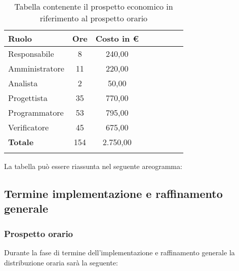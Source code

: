 			\begin{longtable}{|l|c|c|c|c|c|c|c|}
				\hline
				\rowcolor{lighter-grayer}
				\textbf{Ruolo} & \textbf{Ore} & \textbf{Costo in €} \\
				\hline
				\endfirsthead
				
				\hline
				Responsabile & 8 & 240,00\\
				\hline
				\hline
				Amministratore & 11 & 220,00\\
				\hline
				\hline
				Analista & 2 & 50,00\\
				\hline
				\hline
				Progettista & 35 & 770,00\\
				\hline
				\hline
				Programmatore & 53 & 795,00\\
				\hline
				\hline
				Verificatore & 45 & 675,00\\
				\hline
				\textbf{Totale} & 154 & 2.750,00\\
				\hline
				\caption{Tabella contenente il prospetto economico in riferimento al prospetto orario}
			\end{longtable}
			\pagebreak
		
			La tabella può essere riassunta nel seguente areogramma:

			\subsection{Termine implementazione e raffinamento generale}
            \subsubsection{Prospetto orario}
			Durante la fase di termine dell'implementazione e raffinamento generale la distribuzione oraria sarà la seguente:
			
